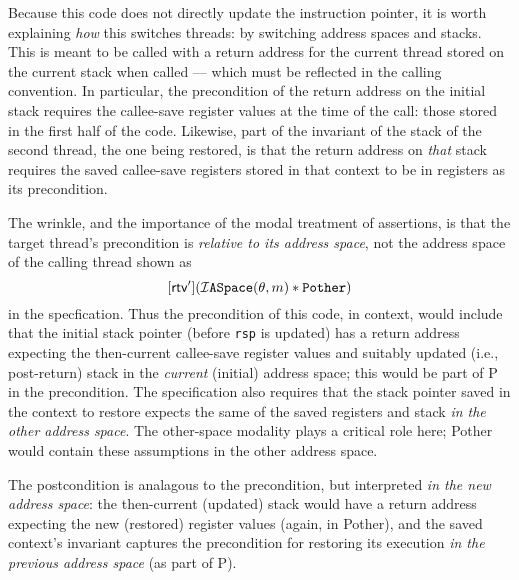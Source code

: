 Because this code does not directly update the instruction pointer, it is worth explaining \emph{how} this switches threads: by switching address spaces and stacks. 
This is meant to be called with a return address for the current thread stored on the current stack when called --- which must be reflected in the calling convention. 
In particular, the precondition of the return address on the initial stack requires the callee-save register values at the time of the call: those stored in the first 
half of the code.
Likewise, part of the invariant of the stack of the second thread, the one being restored, is that the return address on \emph{that} stack requires the saved 
callee-save registers stored in that context to be in registers as its precondition.

The wrinkle, and the importance of the modal treatment of assertions, is that the target thread's precondition is \emph{relative to its address space}, 
not the address space of the calling thread shown as 
\[[\textsf{rtv}'](\mathcal{I}\texttt{ASpace}(\theta,m) \ast \texttt{Pother})\]
in the specfication. 
Thus the precondition of this code,
in context, would include that the initial stack pointer (before \lstinline|rsp| is updated)
has a return address expecting the then-current callee-save register values and 
suitably updated (i.e., post-return) stack in the \emph{current} (initial) address space;
this would be part of \textsf{P} in the precondition.
The specification also requires that
the stack pointer saved in the context to restore expects the same of the saved registers and stack 
\emph{in the other address space}. 
The other-space modality plays a critical role here; \textsf{Pother} would contain these assumptions in the other
address space.


The postcondition is analagous to the precondition, but interpreted \emph{in the new address space}: the then-current (updated) stack would have a return address expecting the new (restored) register values (again, in \textsf{Pother}),
and the saved context's invariant captures the precondition for restoring its execution \emph{in the previous address space} (as part of \textsf{P}). 

